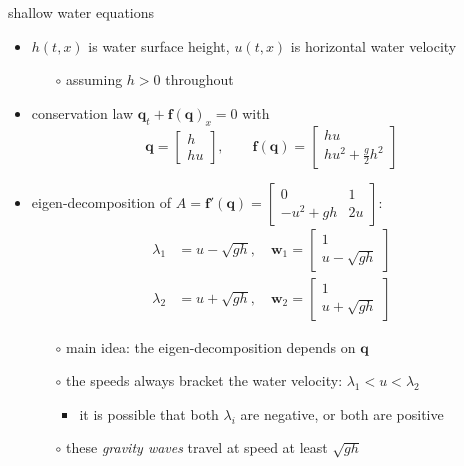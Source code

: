 \documentclass[10pt,dvipsnames,usepdftitle=false,
hyperref={pdftitle = {Finite volume methods},
    pdfauthor = {Ed Bueler}}]{beamer}
\newcommand{\bbf}{\mathbf{f}}
\newcommand{\bq}{\mathbf{q}}
\newcommand{\bw}{\mathbf{w}}
\newcommand{\ds}{\displaystyle}
\begin{document}
\begin{frame}{shallow water equations}

\begin{itemize}
\item $h(t,x)$ is water surface height, $u(t,x)$ is horizontal water velocity
    \begin{itemize}
    \item[$\circ$] assuming $h>0$ throughout
    \end{itemize}
\item conservation law \quad $\bq_t + \bbf(\bq)_x = 0$ with
        $$\bq = \begin{bmatrix} h \\ hu \end{bmatrix}, \qquad \bbf(\bq) = \begin{bmatrix} hu \\ h u^2 + \frac{g}{2} h^2 \end{bmatrix}$$
\item eigen-decomposition of \quad $\ds A=\bbf'(\bq) = \begin{bmatrix} 0 & 1 \\ -u^2 + g h & 2 u \end{bmatrix}$:
\begin{align*}
\lambda_1&=u-\sqrt{gh}, \quad \bw_1 = \begin{bmatrix} 1 \\ u-\sqrt{gh} \end{bmatrix} \\
\lambda_2&=u+\sqrt{gh}, \quad \bw_2 = \begin{bmatrix} 1 \\ u+\sqrt{gh} \end{bmatrix}
\end{align*}

    \begin{itemize}
    \item[$\circ$] main idea: the eigen-decomposition depends on $\bq$
    \item[$\circ$] the speeds always bracket the water velocity: $\lambda_1 < u < \lambda_2$
        \begin{itemize}
        \item it is possible that both $\lambda_i$ are negative, or both are positive
        \end{itemize}
    \item[$\circ$] these \emph{gravity waves} travel at speed at least $\sqrt{gh}$
    \end{itemize}
\end{itemize}
\end{frame}
\end{document}
